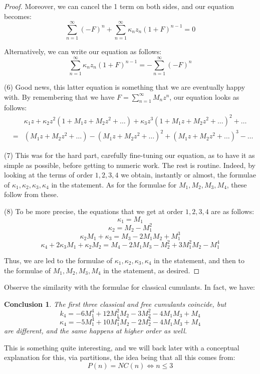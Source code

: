 \documentclass[12pt]{amsbook}
\newtheorem{conclusion}[theorem]{Conclusion}
\begin{document}
\begin{proof}
Moreover, we can cancel the 1 term on both sides, and our equation becomes:
$$\sum_{n=1}^\infty(-F)^n+\sum_{n=1}^\infty\kappa_nz_n(1+F)^{n-1}=0$$

Alternatively, we can write our equation as follows:
$$\sum_{n=1}^\infty\kappa_nz_n(1+F)^{n-1}=-\sum_{n=1}^\infty(-F)^n$$

(6) Good news, this latter equation is something that we are eventually happy with. By remembering that we have $F=\sum_{n=1}^\infty M_nz^n$, our equation looks as follows:
\begin{eqnarray*}
&&\kappa_1z+\kappa_2z^2(1+M_1z+M_2z^2+\ldots)+\kappa_3z^3(1+M_1z+M_2z^2+\ldots)^2+\ldots\\
&=&(M_1z+M_2z^2+\ldots)-(M_1z+M_2z^2+\ldots)^2+(M_1z+M_2z^2+\ldots)^3-\ldots
\end{eqnarray*}

(7) This was for the hard part, carefully fine-tuning our equation, as to have it as simple as possible, before getting to numeric work. The rest is routine. Indeed, by looking at the terms of order $1,2,3,4$ we obtain, instantly or almost, the formulae of $\kappa_1,\kappa_2,\kappa_3,\kappa_4$ in the statement. As for the formulae for $M_1,M_2,M_3,M_4$, these follow from these. 

\medskip

(8) To be more precise, the equations that we get at order $1,2,3,4$ are as follows:
$$\kappa_1=M_1$$
$$\kappa_2=M_2-M_1^2$$
$$\kappa_2M_1+\kappa_3=M_3-2M_1M_2+M_1^3$$
$$\kappa_4+2\kappa_3M_1+\kappa_2M_2=M_4-2M_1M_3-M_2^2+3M_1^2M_2-M_1^4$$

Thus, we are led to the formulae of $\kappa_1,\kappa_2,\kappa_3,\kappa_4$ in the statement, and then to the formulae of $M_1,M_2,M_3,M_4$ in the statement, as desired. 
\end{proof}

Observe the similarity with the formulae for classical cumulants. In fact, we have:

\begin{conclusion}
The first three classical and free cumulants coincide, but
$$k_4=-6M_1^4+12M_1^2M_2-3M_2^2-4M_1M_3+M_4$$
$$\kappa_4=-5M_1^4+10M_1^2M_2-2M_2^2-4M_1M_3+M_4$$
are different, and the same happens at higher order as well.
\end{conclusion}

This is something quite interesting, and we will back later with a conceptual explanation for this, via partitions, the idea being that all this comes from:
$$P(n)=NC(n)\iff n\leq 3$$
\end{document}
